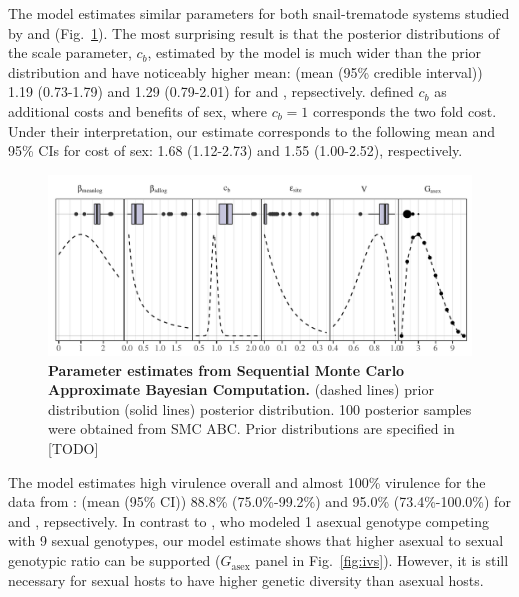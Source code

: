 \documentclass{article}\usepackage[]{graphicx}\usepackage[]{color}
\newcommand{\fref}[1]{Fig.~\ref{fig:#1}}
\begin{document}
The model estimates similar parameters for both snail-trematode systems studied by \cite{mckone2016fine} and \cite{vergara2014infection} (\fref{smcparam}).
The most surprising result is that the posterior distributions of the scale parameter, $c_b$, estimated by the model is much wider than the prior distribution and have noticeably higher mean: (mean (95\% credible interval)) 1.19 (0.73-1.79) and 1.29 (0.79-2.01) for \cite{mckone2016fine} and \cite{vergara2014infection}, repsectively. %
\cite{ashby2015diversity} defined $c_b$ as additional costs and benefits of sex, where $c_b=1$ corresponds the two fold cost.
Under their interpretation, our estimate corresponds to the following mean and 95\% CIs for cost of sex: 1.68 (1.12-2.73) and 1.55 (1.00-2.52), respectively.

\begin{figure}[!htp]
\includegraphics[width=\textwidth]{../fig/verg_post.pdf}
\caption{{\bf Parameter estimates from Sequential Monte Carlo Approximate Bayesian Computation.}
(dashed lines) prior distribution (solid lines) posterior distribution. 100 posterior samples were obtained from SMC ABC. Prior distributions are specified in [TODO]
}
\label{fig:smcparam}
\end{figure}

The model estimates high virulence overall and almost 100\% virulence for the data from \cite{mckone2016fine}: (mean (95\% CI)) 88.8\% (75.0\%-99.2\%) and 95.0\% (73.4\%-100.0\%) for \cite{vergara2014infection} and \cite{mckone2016fine}, repsectively.
In contrast to \cite{lively2010epidemiological}, who modeled 1 asexual genotype competing with 9 sexual genotypes, our model estimate shows that higher asexual to sexual genotypic ratio can be supported ($G_{\textrm{asex}}$ panel in \fref{ivs}).
However, it is still necessary for sexual hosts to have higher genetic diversity than asexual hosts.
\end{document}
